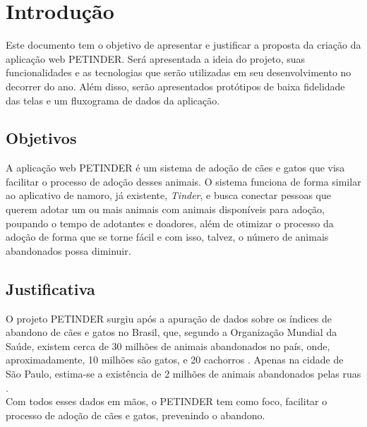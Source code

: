 \chapter[Introdução]{Introdução}
Este documento tem o objetivo de apresentar e justificar a proposta da criação da aplicação web PETINDER. Será apresentada a ideia do projeto, suas funcionalidades e as tecnologias que serão utilizadas em seu desenvolvimento no decorrer do ano. Além disso, serão apresentados protótipos de baixa fidelidade das telas e um fluxograma de dados da aplicação.

\section{Objetivos}
A aplicação web PETINDER é um sistema de adoção de cães e gatos que visa facilitar o processo de adoção desses animais. O sistema funciona de forma similar ao aplicativo de namoro, já existente, \textit{Tinder}, e busca conectar pessoas que querem adotar um ou mais animais com animais disponíveis para adoção, poupando o tempo de adotantes e doadores, além de otimizar o processo da adoção de forma que se torne fácil e com isso, talvez, o número de animais abandonados possa diminuir.

\section{Justificativa}
O projeto PETINDER surgiu após a apuração de dados sobre os índices de abandono de cães e gatos no Brasil, que, segundo a Organização Mundial da Saúde, existem cerca de 30 milhões de animais abandonados no país, onde, aproximadamente, 10 milhões são gatos, e 20 cachorros \cite{animais_abandonados}. Apenas na cidade de São Paulo, estima-se a existência de 2 milhões de animais abandonados pelas ruas \cite{sao_paulo}.\\
Com todos esses dados em mãos, o PETINDER tem como foco, facilitar o processo de adoção de cães e gatos, prevenindo o abandono.




